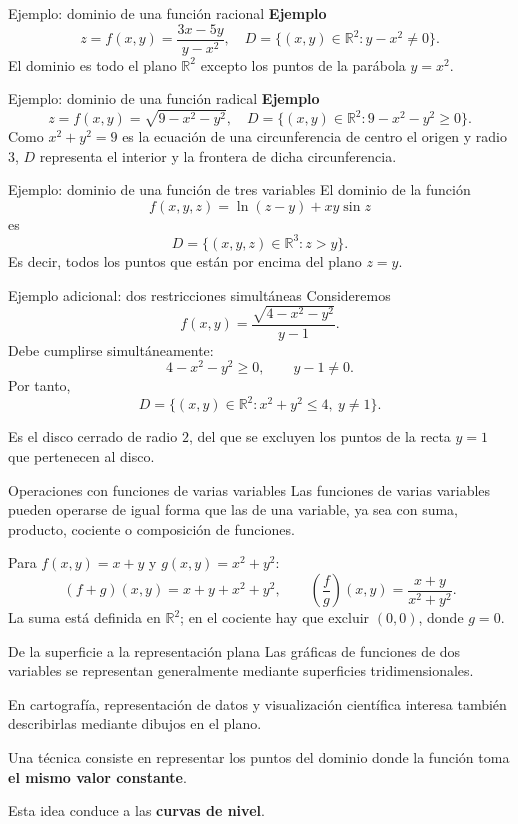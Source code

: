 \documentclass[main.tex]{subfiles}
\begin{document}
\begin{frame}{Ejemplo: dominio de una función racional}
\textbf{Ejemplo}
\[z=f(x,y)=\frac{3x-5y}{y-x^2},\quad D=\{(x,y)\in\mathbb{R}^2:y-x^2\ne0\}.\]
El dominio es todo el plano $\mathbb{R}^2$ excepto los puntos de la parábola $y=x^2$.
\end{frame}
\begin{frame}{Ejemplo: dominio de una función radical}
\textbf{Ejemplo}
\[z=f(x,y)=\sqrt{9-x^2-y^2},\quad D=\{(x,y)\in\mathbb{R}^2:9-x^2-y^2\ge0\}.\]
\small Como $x^2+y^2=9$ es la ecuación de una circunferencia de centro el origen y radio $3$, $D$ representa el interior y la frontera de dicha circunferencia.
\end{frame}
\begin{frame}{Ejemplo: dominio de una función de tres variables}
El dominio de la función
\[f(x,y,z)=\ln(z-y)+xy\sin z\]
es
\[D=\{(x,y,z)\in\mathbb{R}^3:z>y\}.\]
Es decir, todos los puntos que están por encima del plano $z=y$.
\end{frame}
\begin{frame}{Ejemplo adicional: dos restricciones simultáneas}
Consideremos
\[
f(x,y)=\frac{\sqrt{4-x^2-y^2}}{y-1}.
\]
Debe cumplirse simultáneamente:
\[
4-x^2-y^2\geq0,\qquad y-1\ne0.
\]
Por tanto,
\[
\boxed{D=\{(x,y)\in\mathbb R^2:
x^2+y^2\leq4,\ y\ne1\}.}
\]
\medskip

Es el disco cerrado de radio $2$, del que se excluyen los puntos de la recta $y=1$ que pertenecen al disco.
\end{frame}

\begin{frame}{Operaciones con funciones de varias variables}
Las funciones de varias variables pueden operarse de igual forma que las de una variable, ya sea con suma, producto, cociente o composición de funciones.
\medskip

Para $f(x,y)=x+y$ y $g(x,y)=x^2+y^2$:
\[
(f+g)(x,y)=x+y+x^2+y^2,
\qquad
\left(\frac fg\right)(x,y)=\frac{x+y}{x^2+y^2}.
\]
La suma está definida en $\mathbb R^2$;
en el cociente hay que excluir $(0,0)$, donde $g=0$.
\end{frame}
\begin{frame}{De la superficie a la representación plana}
Las gráficas de funciones de dos variables se representan generalmente mediante superficies tridimensionales.
\medskip

En cartografía, representación de datos y visualización científica
interesa también describirlas mediante dibujos en el plano.
\medskip

Una técnica consiste en representar los puntos del dominio donde la función toma \textbf{el mismo valor constante}.
\medskip

Esta idea conduce a las \textbf{curvas de nivel}.
\end{frame}
\end{document}

